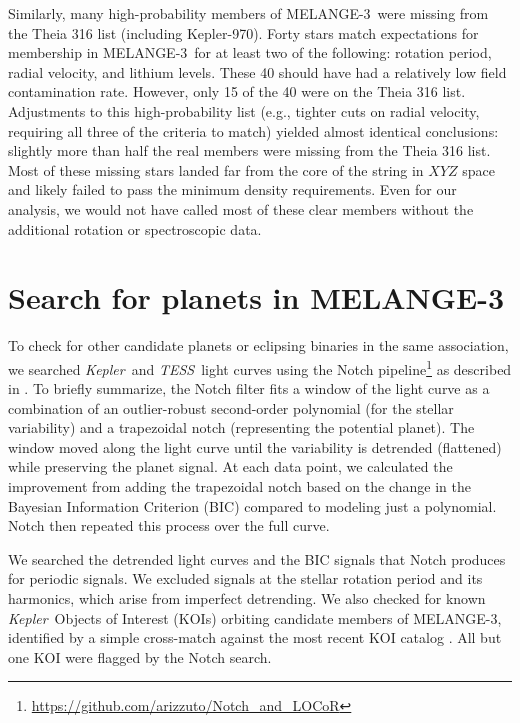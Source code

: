 \documentclass[twocolumn, linenumbers]{aastex631}
\newcommand{\association}{MELANGE-3}
\newcommand{\starnametwo}{Kepler-970}
\newcommand{\kepler}{{\it Kepler}}
\newcommand{\tess}{\textit{TESS}}
\begin{document}
Similarly, many high-probability members of \association\ were missing from the Theia 316 list (including \starnametwo). Forty stars match expectations for membership in \association\ for at least two of the following: rotation period, radial velocity, and lithium levels. These 40 should have had a relatively low field contamination rate. However, only 15 of the 40 were on the Theia 316 list. Adjustments to this high-probability list (e.g., tighter cuts on radial velocity, requiring all three of the criteria to match) yielded almost identical conclusions: slightly more than half the real members were missing from the Theia 316 list. Most of these missing stars landed far from the core of the string in $XYZ$ space and likely failed to pass the minimum density requirements. Even for our analysis, we would not have called most of these clear members without the additional rotation or spectroscopic data. 


\section{Search for planets in \association}\label{sec:search}

To check for other candidate planets or eclipsing binaries in the same association, we searched \kepler\ and \tess\ light curves using the Notch pipeline\footnote{\url{https://github.com/arizzuto/Notch_and_LOCoR}} as described in \citet{Rizzuto2017}. To briefly summarize, the Notch filter fits a window of the light curve as a combination of an outlier-robust second-order polynomial (for the stellar variability) and a trapezoidal notch (representing the potential planet). The window moved along the light curve until the variability is detrended (flattened) while preserving the planet signal. At each data point, we calculated the improvement from adding the trapezoidal notch based on the change in the Bayesian Information Criterion (BIC) compared to modeling just a polynomial. Notch then repeated this process over the full curve. 

We searched the detrended light curves and the BIC signals that Notch produces for periodic signals. We excluded signals at the stellar rotation period and its harmonics, which arise from imperfect detrending. We also checked for known \kepler\ Objects of Interest (KOIs) orbiting candidate members of \association, identified by a simple cross-match against the most recent KOI catalog \citep{2016AJ....152..158T}. All but one KOI were flagged by the Notch search. 
\end{document}
